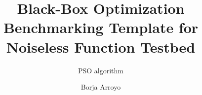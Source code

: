 \documentclass[sigconf]{acmart}
\begin{document}
\title{Black-Box Optimization Benchmarking Template for Noiseless Function
Testbed}
\subtitle{PSO algorithm}



\author{Borja Arroyo}
%
%
%
%
%
%
%

\renewcommand{\shortauthors}{Borja Arroyo et. al.}




%
%
\end{document}
